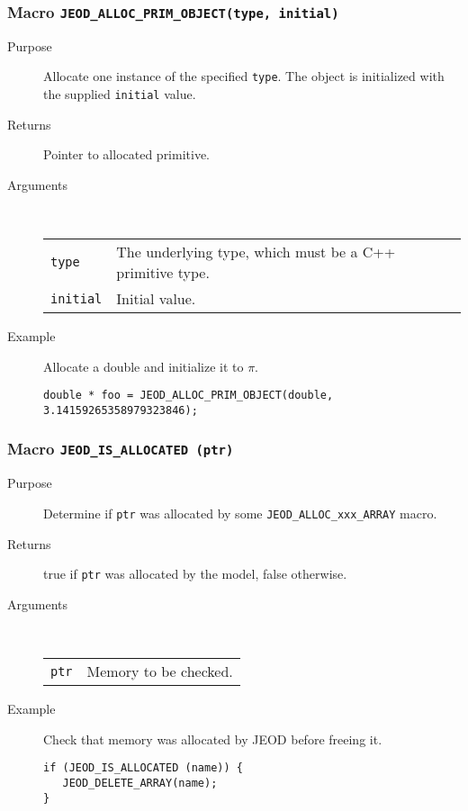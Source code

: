 \subsubsection{Macro {\tt JEOD\_ALLOC\_PRIM\_OBJECT(type, initial)}}
\begin{description}
\item[Purpose]
Allocate one instance of the specified {\tt type}.
The object is initialized with the supplied {\tt initial} value.
\item[Returns] Pointer to allocated primitive.
\item[Arguments] \ \\
\begin{tabular}{@{}ll}
{\tt type} &  The underlying type, which must be a C++ primitive type. \\
{\tt initial} &  Initial value.
\end{tabular}
\item[Example]
Allocate a double and initialize it to $\pi$.
\begin{verbatim}
double * foo = JEOD_ALLOC_PRIM_OBJECT(double, 3.14159265358979323846);
\end{verbatim}
\end{description}

\subsubsection{Macro {\tt JEOD\_IS\_ALLOCATED (ptr)}}
\begin{description}
\item[Purpose]
Determine if {\tt ptr} was allocated by some
\verb|JEOD_ALLOC_xxx_ARRAY| macro.
\item[Returns]
true if {\tt ptr} was allocated by the model, false otherwise.
\item[Arguments] \ \\
\begin{tabular}{@{}ll}
{\tt ptr} &  Memory to be checked.
\end{tabular}
\item[Example]
Check that memory was allocated by JEOD before freeing it.
\begin{verbatim}
if (JEOD_IS_ALLOCATED (name)) {
   JEOD_DELETE_ARRAY(name);
}
\end{verbatim}
\end{description}

